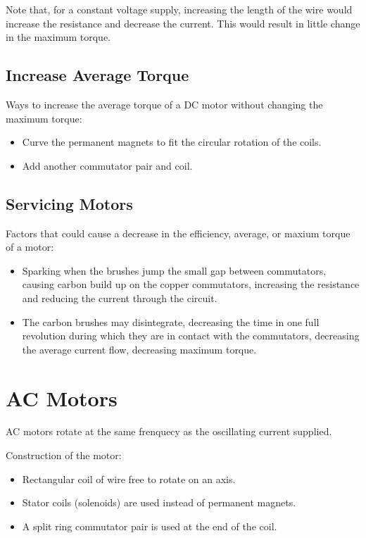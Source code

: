 \documentclass[a4paper,11pt]{article}
\begin{document}
Note that, for a constant voltage supply, increasing the length of the wire
would increase the resistance and decrease the current. This would result in
little change in the maximum torque.


\subsection{Increase Average Torque}

Ways to increase the average torque of a DC motor without changing the maximum
torque:

\begin{itemize}
\item Curve the permanent magnets to fit the circular rotation of the coils.
\item Add another commutator pair and coil.
\end{itemize}


\subsection{Servicing Motors}

Factors that could cause a decrease in the efficiency, average, or maxium
torque of a motor:

\begin{itemize}
\item Sparking when the brushes jump the small gap between commutators,
	causing carbon build up on the copper commutators, increasing the
	resistance and reducing the current through the circuit.
\item The carbon brushes may disintegrate, decreasing the time in one full
	revolution during which they are in contact with the commutators,
	decreasing the average current flow, decreasing maximum torque.
\end{itemize}




\section{AC Motors}

AC motors rotate at the same frenquecy as the oscillating current supplied.

Construction of the motor:

\begin{itemize}
\item Rectangular coil of wire free to rotate on an axis.
\item Stator coils (solenoids) are used instead of permanent magnets.
\item A split ring commutator pair is used at the end of the coil.
\end{itemize}
\end{document}
